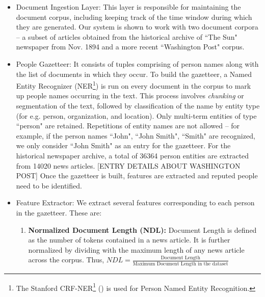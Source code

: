 \documentclass[a4paper,man,natbib]{apa6}
\begin{document}
\begin{itemize}
\item Document Ingestion Layer: This layer is responsible for maintaining the document corpus, including keeping track of the time window during which they are generated. Our system is shown to work with two document corpora -- a subset of articles obtained from the historical archive of ``The Sun" newspaper from Nov. 1894 and a more recent ``Washington Post" corpus. 

\item People Gazetteer: It consists of tuples comprising of person names along with the list of documents in which they occur. To build the gazetteer, a Named Entity Recognizer (NER\footnote{The Stanford CRF-NER\footnote{http://nlp.stanford.edu/software/CRF-NER.shtml} (\cite{mccallum2003early, finkel2005incorporating, sutton2011introduction})  is used for Person Named Entity Recognition. }) is run on every document in the corpus to mark up people names occurring in the text. This process involves \emph{chunking} or segmentation of the text, followed by classification of the name by entity type (for e.g. person, organization, and location). Only multi-term entities of type ``person" are retained. Repetitions of entity names are not allowed -- for example, if the person names ``John", ``John Smith", ``Smith" are recognized, we only consider ``John Smith" as an entry for the gazetteer. For the historical newspaper archive, a total of 36364 person entities are extracted from 14020 news articles. [ENTRY DETAILS ABOUT WASHINGTON POST]
Once the gazetteer is built, features are extracted and reputed people need to be identified.

\item Feature Extractor: We extract several features corresponding to each person in the gazetteer. These are:

\begin{enumerate}
\item \textbf{Normalized Document Length (NDL): } Document Length is defined as the number of tokens contained in a news article. It is further normalized by dividing with the maximum length of any news article across the corpus. Thus,  
$NDL= \frac{\text{Document Length}} {\text{Maximum Document Length in the dataset}}$



\end{enumerate}
\end{itemize}
\end{document}
